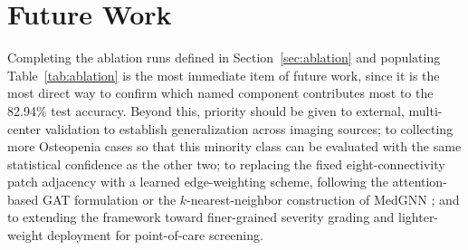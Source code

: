 \documentclass[conference]{IEEEtran}
\begin{document}
\section{Future Work}
\label{sec:futurework}
Completing the ablation runs defined in Section~\ref{sec:ablation} and populating Table~\ref{tab:ablation} is the most immediate item of future work, since it is the most direct way to confirm which named component contributes most to the 82.94\% test accuracy. Beyond this, priority should be given to external, multi-center validation to establish generalization across imaging sources; to collecting more Osteopenia cases so that this minority class can be evaluated with the same statistical confidence as the other two; to replacing the fixed eight-connectivity patch adjacency with a learned edge-weighting scheme, following the attention-based GAT formulation \cite{velickovic2018graph} or the $k$-nearest-neighbor construction of MedGNN \cite{ye2026medgnn}; and to extending the framework toward finer-grained severity grading and lighter-weight deployment for point-of-care screening.
\end{document}
